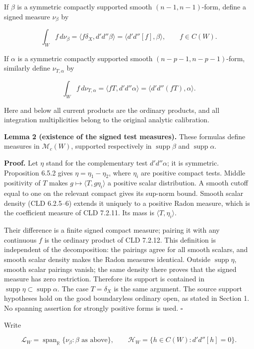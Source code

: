 \documentclass[
  11pt,
]{article}
\begin{document}
If \(\beta\) is a symmetric compactly supported smooth
\((n-1,n-1)\)-form, define a signed measure \(\nu_\beta\) by

\[
\int_W f\,d\nu_\beta
 =\langle f\delta_X,d'd''\beta\rangle
 =\langle d'd''[f],\beta\rangle,\qquad f\in C(W).
\]

If \(\alpha\) is a symmetric compactly supported smooth
\((n-p-1,n-p-1)\)-form, similarly define \(\nu_{T,\alpha}\) by

\[
\int_W f\,d\nu_{T,\alpha}
 =\langle fT,d'd''\alpha\rangle
 =\langle d'd''(fT),\alpha\rangle.
\]

Here and below all current products are the ordinary products, and all
integration multiplicities belong to the original analytic calibration.

\textbf{Lemma 2 (existence of the signed test measures).} These formulas
define measures in \(\mathscr M_c(W)\), supported respectively in
\(\operatorname{supp}\beta\) and \(\operatorname{supp}\alpha\).

\textbf{Proof.} Let \(\eta\) stand for the complementary test
\(d'd''\alpha\); it is symmetric. Proposition 6.5.2 gives
\(\eta=\eta_1-\eta_2\), where \(\eta_i\) are positive compact tests.
Middle positivity of \(T\) makes \(g\mapsto\langle T,g\eta_i\rangle\) a
positive scalar distribution. A smooth cutoff equal to one on the
relevant compact gives its sup-norm bound. Smooth scalar density (CLD
6.2.5--6) extends it uniquely to a positive Radon measure, which is the
coefficient measure of CLD 7.2.11. Its mass is
\(\langle T,\eta_i\rangle\).

Their difference is a finite signed compact measure; pairing it with any
continuous \(f\) is the ordinary product of CLD 7.2.12. This definition
is independent of the decomposition: the pairings agree for all smooth
scalars, and smooth scalar density makes the Radon measures identical.
Outside \(\operatorname{supp}\eta\), smooth scalar pairings vanish; the
same density there proves that the signed measure has zero restriction.
Therefore its support is contained in
\(\operatorname{supp}\eta\subset\operatorname{supp}\alpha\). The case
\(T=\delta_X\) is the same argument. The source support hypotheses hold
on the good boundaryless ordinary open, as stated in Section 1. No
spanning assertion for strongly positive forms is used. \(\square\)

Write

\[
\mathscr L_W=\operatorname{span}_{\mathbb R}\{\nu_\beta:\beta
 \text{ as above}\},\qquad
\mathscr H_W=\{h\in C(W):d'd''[h]=0\}.
\]
\end{document}

